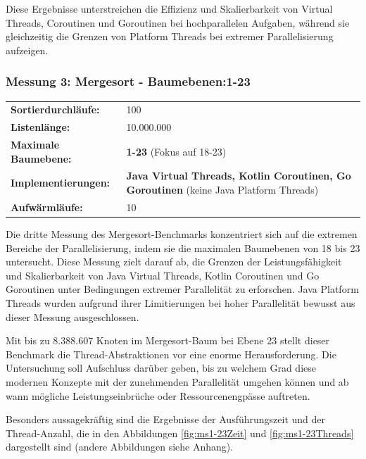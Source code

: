 \documentclass[fontsize=12pt,paper=a4,twoside=semi,parskip=half-,headsepline,headinclude]{scrreprt}
\begin{document}
Diese Ergebnisse unterstreichen die Effizienz und Skalierbarkeit von Virtual Threads, Coroutinen und Goroutinen bei hochparallelen Aufgaben, während sie gleichzeitig die Grenzen von Platform Threads bei extremer Parallelisierung aufzeigen.

\subsubsection{Messung 3: Mergesort - Baumebenen:1-23}

\begin{tabularx}{\textwidth}{@{}lX@{}}
	\textbf{Sortierdurchläufe:} & 100 \\
	\textbf{Listenlänge:} & 10.000.000 \\
	\textbf{Maximale Baumebene:} & \textbf{1-23} (Fokus auf 18-23) \\
	\textbf{Implementierungen:} & \textbf{Java Virtual Threads, Kotlin Coroutinen, Go Goroutinen} (keine Java Platform Threads) \\
	\textbf{Aufwärmläufe:} & 10
\end{tabularx}

Die dritte Messung des Mergesort-Benchmarks konzentriert sich auf die extremen Bereiche der Parallelisierung, indem sie die maximalen Baumebenen von 18 bis 23 untersucht. Diese Messung zielt darauf ab, die Grenzen der Leistungsfähigkeit und Skalierbarkeit von Java Virtual Threads, Kotlin Coroutinen und Go Goroutinen unter Bedingungen extremer Parallelität zu erforschen. Java Platform Threads wurden aufgrund ihrer Limitierungen bei hoher Parallelität bewusst aus dieser Messung ausgeschlossen.

Mit bis zu 8.388.607 Knoten im Mergesort-Baum bei Ebene 23 stellt dieser Benchmark die Thread-Abstraktionen vor eine enorme Herausforderung. Die Untersuchung soll Aufschluss darüber geben, bis zu welchem Grad diese modernen Konzepte mit der zunehmenden Parallelität umgehen können und ab wann mögliche Leistungseinbrüche oder Ressourcenengpässe auftreten.

Besonders aussagekräftig sind die Ergebnisse der Ausführungszeit und der Thread-Anzahl, die in den Abbildungen \ref{fig:ms1-23Zeit} und \ref{fig:ms1-23Threads} dargestellt sind (andere Abbildungen siehe Anhang).
\end{document}
